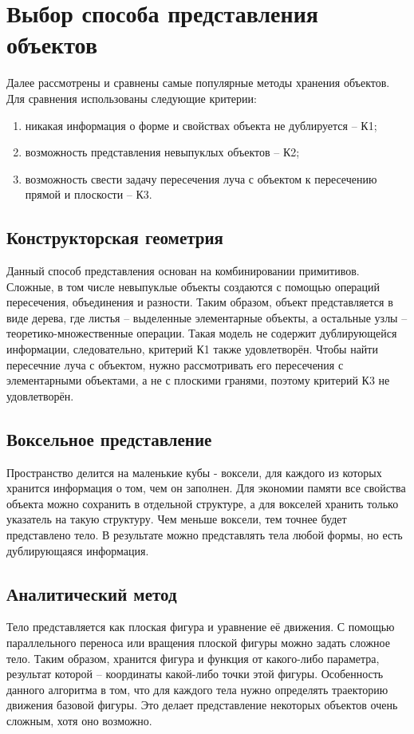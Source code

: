 \section{Выбор способа представления объектов} {
    Далее рассмотрены и сравнены самые популярные методы хранения объектов.
    Для сравнения использованы следующие критерии:
    \begin{enumerate}
        \item никакая информация о форме и свойствах объекта
        не дублируется -- К1;
        \item возможность представления невыпуклых объектов -- К2;
        \item возможность свести задачу пересечения луча с объектом
        к пересечению прямой и плоскости -- К3.
    \end{enumerate}
    \subsection{Конструкторская геометрия} {
        Данный способ представления основан на комбинировании примитивов.
        Сложные, в том числе невыпуклые объекты создаются с помощью операций пересечения, объединения и разности.
        Таким образом, объект представляется в виде дерева,
        где листья -- выделенные элементарные объекты, а остальные узлы --
        теоретико-множественные операции.
        Такая модель не содержит дублирующейся информации, следовательно, критерий
        К1 также удовлетворён.
        Чтобы найти пересечние луча с объектом, нужно рассмотривать его
        пересечения с элементарными объектами, а не с плоскими гранями,
        поэтому критерий К3 не удовлетворён.
    }
    \subsection{Воксельное представление} {
        Пространство делится на маленькие кубы - воксели, для
        каждого из которых хранится информация о том, чем он заполнен.
        Для экономии памяти все свойства объекта можно сохранить в отдельной
        структуре, а для вокселей хранить только указатель на такую структуру.
        Чем меньше воксели, тем точнее будет представлено тело.
        В результате можно представлять тела любой формы,
        но есть дублирующаяся информация.
    }
    \subsection{Аналитический метод} {
        Тело представляется как плоская фигура и уравнение её движения.
        С помощью параллельного переноса или вращения плоской фигуры
        можно задать сложное тело.
        Таким образом, хранится фигура и функция от какого-либо параметра,
        результат которой -- координаты какой-либо точки этой фигуры.
        Особенность данного алгоритма в том, что для каждого тела нужно определять
        траекторию движения базовой фигуры.
        Это делает представление некоторых объектов очень сложным, хотя оно возможно.
    }
}
